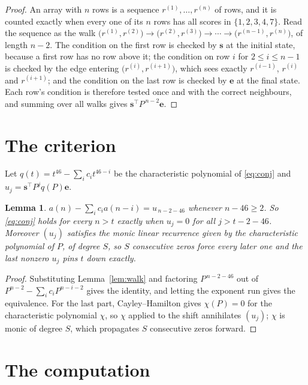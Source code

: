 \documentclass[11pt,a4paper]{article}
\theoremstyle{plain}
\newtheorem{lemma}[theorem]{Lemma}
\theoremstyle{definition}
\begin{document}
\begin{proof}
An array with $n$ rows is a sequence $r^{(1)},\dots,r^{(n)}$ of rows, and it is counted
exactly when every one of its $n$ rows has all scores in $\{1,2,3,4,7\}$. Read the sequence as the
walk $\bigl(r^{(1)},r^{(2)}\bigr)\to\bigl(r^{(2)},r^{(3)}\bigr)\to\cdots\to
\bigl(r^{(n-1)},r^{(n)}\bigr)$, of length $n-2$. The condition on the first row is
checked by $\mathbf{s}$ at the initial state, because a first row has no row above it; the
condition on row $i$ for $2\le i\le n-1$ is checked by the edge entering
$\bigl(r^{(i)},r^{(i+1)}\bigr)$, which sees exactly $r^{(i-1)}$, $r^{(i)}$ and
$r^{(i+1)}$; and the condition on the last row is checked by $\mathbf{e}$ at the final
state. Each row's condition is therefore tested once and with the correct neighbours, and
summing over all walks gives $\mathbf{s}^{\!\top}P^{\,n-2}\mathbf{e}$.
\end{proof}

\section{The criterion}

Let $q(t)=t^{46}-\sum_i c_i t^{46-i}$ be the characteristic polynomial of
\eqref{eq:conj} and $u_j=\mathbf{s}^{\!\top}P^{j}q(P)\mathbf{e}$.

\begin{lemma}\label{lem:crit}
$a(n)-\sum_i c_i a(n-i)=u_{\,n-2-46}$ whenever $n-46\ge2$. So \eqref{eq:conj}
holds for every $n>t$ exactly when $u_j=0$ for all $j>t-2-46$. Moreover $(u_j)$
satisfies the monic linear recurrence given by the characteristic polynomial of $P$, of
degree $S$, so $S$ consecutive zeros force every later one and the last nonzero $u_j$ pins
$t$ down exactly.
\end{lemma}

\begin{proof}
Substituting Lemma~\ref{lem:walk} and factoring $P^{\,n-2-46}$ out of
$P^{n-2}-\sum_i c_i P^{n-i-2}$ gives the identity, and letting the exponent run gives the
equivalence. For the last part, Cayley--Hamilton gives $\chi(P)=0$ for the characteristic
polynomial $\chi$, so $\chi$ applied to the shift annihilates $(u_j)$; $\chi$ is monic of
degree $S$, which propagates $S$ consecutive zeros forward.
\end{proof}

\section{The computation}
\end{document}
